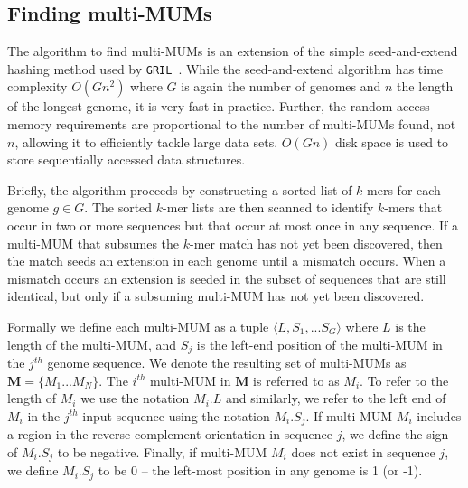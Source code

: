 \documentclass[titlepage,11pt]{article}
\begin{document}
\subsection*{Finding multi-MUMs}


The algorithm to find multi-MUMs is an extension of the simple seed-and-extend
hashing method used by \texttt{GRIL}~\citep{gril}.  While the seed-and-extend
algorithm has time complexity $O(G n^2)$ where $G$ is
again the number of genomes and $n$ the length of the longest genome, it is very
fast in practice.  Further, the random-access memory requirements are proportional to the
number of multi-MUMs found, not $n$, allowing it to efficiently tackle large
data sets.  $O(G n)$ disk space is used to store sequentially accessed data
structures.

Briefly, the algorithm proceeds by constructing a sorted list of $k$-mers for
each genome $g \in G$.  The sorted $k$-mer lists are then scanned to identify
$k$-mers that occur in two or more sequences but that occur at most once in any
sequence.  If a multi-MUM that subsumes the $k$-mer match has not yet been
discovered, then the match
seeds an extension in each genome until a mismatch occurs.  When a mismatch
occurs an extension is seeded in the subset of sequences that are still
identical, but only if a subsuming multi-MUM has not yet been discovered.

Formally we define each multi-MUM as a tuple $\langle L, S_1,...S_G\rangle$ where
$L$ is the length of the multi-MUM, and $S_j$ is the left-end position of the
multi-MUM in the $j^{th}$ genome sequence.
We denote the resulting set of multi-MUMs as $\mathbf{M} = \{M_1...M_N\}$.  The
$i^{th}$ multi-MUM in $\mathbf{M}$ is referred to as $M_i$.  To refer to the length of
$M_i$ we use the notation $M_i.L$ and similarly, we refer to the left end of
$M_i$ in the $j^{th}$ input sequence using the notation $M_i.S_j$.  If
multi-MUM $M_i$ includes a region in the reverse complement orientation in sequence
$j$, we define the sign of $M_i.S_j$ to be negative.  Finally, if multi-MUM
$M_i$ does not exist in sequence $j$, we define $M_i.S_j$ to be 0 -- the
left-most position in any genome is 1 (or -1).
\end{document}
